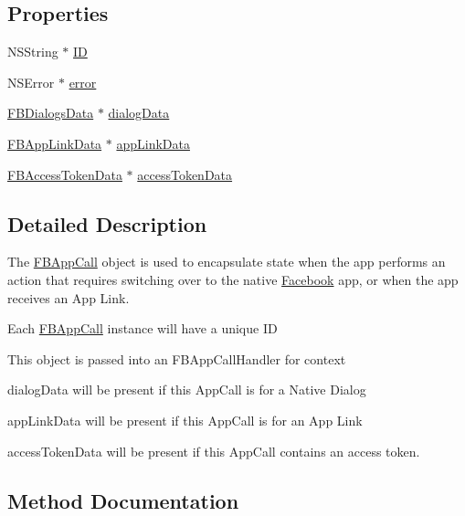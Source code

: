 \subsection*{Properties}
\begin{DoxyCompactItemize}
\item 
N\+S\+String $\ast$ \hyperlink{interfaceFBAppCall_ac4740594ea012e6547f75e88693119eb}{ID}
\item 
N\+S\+Error $\ast$ \hyperlink{interfaceFBAppCall_aed10727acfff363d6eb743f6007677a0}{error}
\item 
\hyperlink{interfaceFBDialogsData}{F\+B\+Dialogs\+Data} $\ast$ \hyperlink{interfaceFBAppCall_aaf9beb85a4197624cb5015308a233164}{dialog\+Data}
\item 
\hyperlink{interfaceFBAppLinkData}{F\+B\+App\+Link\+Data} $\ast$ \hyperlink{interfaceFBAppCall_af6f3fbaa94ec4e8b0431e52ceb277a67}{app\+Link\+Data}
\item 
\hyperlink{interfaceFBAccessTokenData}{F\+B\+Access\+Token\+Data} $\ast$ \hyperlink{interfaceFBAppCall_a378d754034c55047da9b03599fc5022f}{access\+Token\+Data}
\end{DoxyCompactItemize}


\subsection{Detailed Description}
The \hyperlink{interfaceFBAppCall}{F\+B\+App\+Call} object is used to encapsulate state when the app performs an action that requires switching over to the native \hyperlink{interfaceFacebook}{Facebook} app, or when the app receives an App Link.


\begin{DoxyItemize}
\item Each \hyperlink{interfaceFBAppCall}{F\+B\+App\+Call} instance will have a unique ID
\item This object is passed into an F\+B\+App\+Call\+Handler for context
\item dialog\+Data will be present if this App\+Call is for a Native Dialog
\item app\+Link\+Data will be present if this App\+Call is for an App Link
\item access\+Token\+Data will be present if this App\+Call contains an access token. 
\end{DoxyItemize}

\subsection{Method Documentation}
\mbox{\label{interfaceFBAppCall_a03baee771317510fb167dad8926bc176}} 
